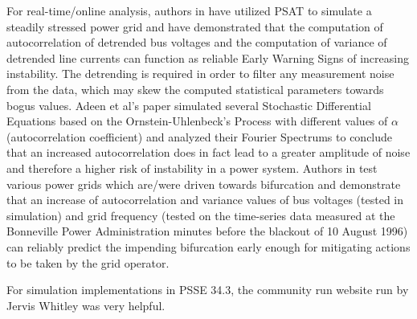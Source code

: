 For real-time/online analysis, authors in \cite{ghanvati01} have utilized PSAT \cite{psatMilano} to simulate a steadily stressed power grid and have demonstrated that the computation of autocorrelation of detrended bus voltages and the computation  of variance of detrended line currents can function as reliable Early Warning Signs of increasing instability. The detrending is required in order to filter any measurement noise from the data, which may skew the computed statistical parameters towards bogus values. Adeen et al's paper \cite{adeen01} simulated several Stochastic Differential Equations based on the Ornstein-Uhlenbeck's Process with different values of $\alpha$ (autocorrelation coefficient) and analyzed their Fourier Spectrums to conclude that an increased autocorrelation does in fact lead to a greater amplitude of noise and therefore a higher risk of instability in a power system. Authors in \cite{sanchez01} test various power grids which are/were driven towards bifurcation and demonstrate that an increase of autocorrelation and variance values of bus voltages (tested in simulation) and grid frequency (tested on the time-series data measured at the Bonneville Power Administration minutes before the blackout of 10 August 1996) can reliably predict the impending bifurcation early enough for mitigating actions to be taken by the grid operator.

For simulation implementations in PSSE 34.3, the community run website run by Jervis Whitley \cite{psspyWebsite} was very helpful.